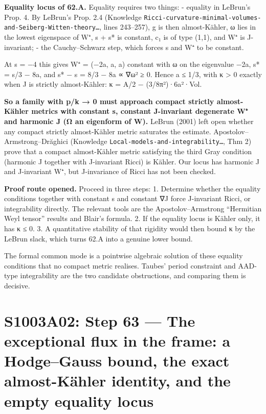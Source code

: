 \documentclass[
  10pt,
]{report}
\begin{document}
\textbf{Equality locus of 62.A.} Equality requires two things: -
equality in LeBrun's Prop. 4. By LeBrun's Prop. 2.4 (Knowledge
\texttt{Ricci-curvature-minimal-volumes-and-Seiberg-Witten-theory\ldots{}},
lines 243--257), g is then almost-Kähler, ω lies in the lowest
eigenspace of W⁺, s + s* is constant, c₁ is of type (1,1), and W⁺ is
J-invariant; - the Cauchy--Schwarz step, which forces s and
\textbar W⁺\textbar{} to be constant.

At s = −4 this gives W⁺ = (−2a, a, a) constant with ω on the eigenvalue
−2a, s* = s/3 − 8a, and s* − s = 8/3 − 8a ∝ \textbar∇ω\textbar² ≥ 0.
Hence a ≤ 1/3, with κ \textgreater{} 0 exactly when J is strictly
almost-Kähler: κ = A/2 − (3/8π²)·6a²·Vol.

\textbf{So a family with p/k → 0 must approach compact strictly
almost-Kähler metrics with constant s, constant J-invariant degenerate
W⁺ and harmonic J (Ω an eigenform of W).} LeBrun (2001) left open
whether any compact strictly almost-Kähler metric saturates the
estimate. Apostolov--Armstrong--Drăghici (Knowledge
\texttt{Local-models-and-integrability\ldots{}}, Thm 2) prove that a
compact almost-Kähler metric satisfying the third Gray condition
(harmonic J together with J-invariant Ricci) is Kähler. Our locus has
harmonic J and J-invariant W⁺, but J-invariance of Ricci has not been
checked.

\textbf{Proof route opened.} Proceed in three steps: 1. Determine
whether the equality conditions together with constant s and constant
\textbar∇J\textbar{} force J-invariant Ricci, or integrability directly.
The relevant tools are the Apostolov--Armstrong ``Hermitian Weyl
tensor'' results and Blair's formula. 2. If the equality locus is Kähler
only, it has κ ≤ 0. 3. A quantitative stability of that rigidity would
then bound κ by the LeBrun slack, which turns 62.A into a genuine lower
bound.

The formal common mode is a pointwise algebraic solution of these
equality conditions that no compact metric realises. Taubes' period
constraint and AAD-type integrability are the two candidate
obstructions, and comparing them is decisive.

\hypertarget{s1003a02-step-63-the-exceptional-flux-in-the-frame-a-hodgegauss-bound-the-exact-almost-kuxe4hler-identity-and-the-empty-equality-locus}{%
\chapter{S1003A02: Step 63 --- The exceptional flux in the frame: a
Hodge--Gauss bound, the exact almost-Kähler identity, and the empty
equality
locus}\label{s1003a02-step-63-the-exceptional-flux-in-the-frame-a-hodgegauss-bound-the-exact-almost-kuxe4hler-identity-and-the-empty-equality-locus}}
\end{document}
